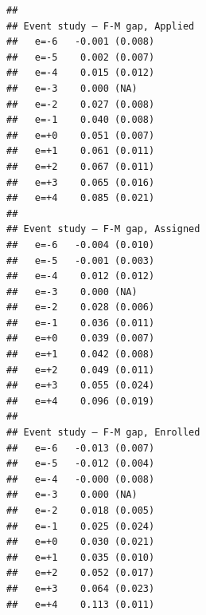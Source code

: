 \documentclass[
]{article}
\begin{document}
\begin{table}[htbp]
   \caption{Pipeline Outcomes by Gender with Within-Class Gap}\label{tab: gap pipeline}
   \centerline{}
\end{table}

\begin{verbatim}
## 
## Event study — F-M gap, Applied 
##   e=-6   -0.001 (0.008)
##   e=-5    0.002 (0.007)
##   e=-4    0.015 (0.012)
##   e=-3    0.000 (NA)
##   e=-2    0.027 (0.008)
##   e=-1    0.040 (0.008)
##   e=+0    0.051 (0.007)
##   e=+1    0.061 (0.011)
##   e=+2    0.067 (0.011)
##   e=+3    0.065 (0.016)
##   e=+4    0.085 (0.021)
## 
## Event study — F-M gap, Assigned 
##   e=-6   -0.004 (0.010)
##   e=-5   -0.001 (0.003)
##   e=-4    0.012 (0.012)
##   e=-3    0.000 (NA)
##   e=-2    0.028 (0.006)
##   e=-1    0.036 (0.011)
##   e=+0    0.039 (0.007)
##   e=+1    0.042 (0.008)
##   e=+2    0.049 (0.011)
##   e=+3    0.055 (0.024)
##   e=+4    0.096 (0.019)
## 
## Event study — F-M gap, Enrolled 
##   e=-6   -0.013 (0.007)
##   e=-5   -0.012 (0.004)
##   e=-4   -0.000 (0.008)
##   e=-3    0.000 (NA)
##   e=-2    0.018 (0.005)
##   e=-1    0.025 (0.024)
##   e=+0    0.030 (0.021)
##   e=+1    0.035 (0.010)
##   e=+2    0.052 (0.017)
##   e=+3    0.064 (0.023)
##   e=+4    0.113 (0.011)
\end{verbatim}
\end{document}
